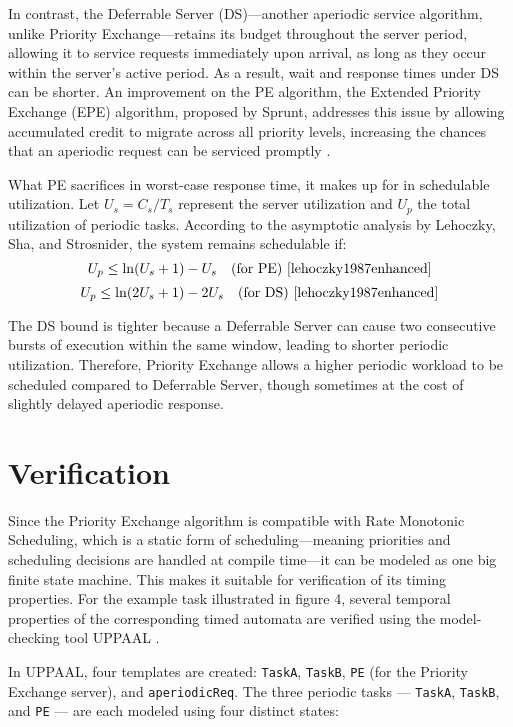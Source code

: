 \documentclass[conference]{IEEEtran}
\begin{document}
In contrast, the Deferrable Server (DS)—another aperiodic service algorithm, unlike Priority Exchange—retains its budget throughout the server period, allowing it to service requests immediately upon arrival, as long as they occur within the server's active period. As a result, wait and response times under DS can be shorter. 
An improvement on the PE algorithm, the Extended Priority Exchange (EPE) algorithm, proposed by Sprunt, addresses this issue by allowing accumulated credit to migrate across all priority levels, increasing the chances that an aperiodic request can be serviced promptly \cite{sprunt1990aperiodic}.

What PE sacrifices in worst-case response time, it makes up for in schedulable utilization. Let $U_s = C_s / T_s$ represent the server utilization and $U_p$ the total utilization of periodic tasks. According to the asymptotic analysis by Lehoczky, Sha, and Strosnider, the system remains schedulable if: 
\begin{equation}
U_p \leq \ln(U_s + 1) - U_s \quad \text{(for PE) \cite{lehoczky1987enhanced}}
\end{equation}
\begin{equation}
U_p \leq \ln(2U_s + 1) - 2U_s \quad \text{(for DS) \cite{lehoczky1987enhanced}}
\end{equation}

The DS bound is tighter because a Deferrable Server can cause two consecutive bursts of execution within the same window, leading to shorter periodic utilization. Therefore, Priority Exchange allows a higher periodic workload to be scheduled compared to Deferrable Server, though sometimes at the cost of slightly delayed aperiodic response.

\section{Verification}
Since the Priority Exchange algorithm is compatible with Rate Monotonic Scheduling, which is a static form of scheduling—meaning priorities and scheduling decisions are handled at compile time—it can be modeled as one big finite state machine. This makes it suitable for verification of its timing properties. For the example task illustrated in figure 4, several temporal properties of the corresponding timed automata are verified using the model-checking tool UPPAAL \cite{spuri1996scheduling}.

In UPPAAL, four templates are created: \texttt{TaskA}, \texttt{TaskB}, \texttt{PE} (for the Priority Exchange server), and \texttt{aperiodicReq}. The three periodic tasks — \texttt{TaskA}, \texttt{TaskB}, and \texttt{PE} — are each modeled using four distinct states:
\end{document}
